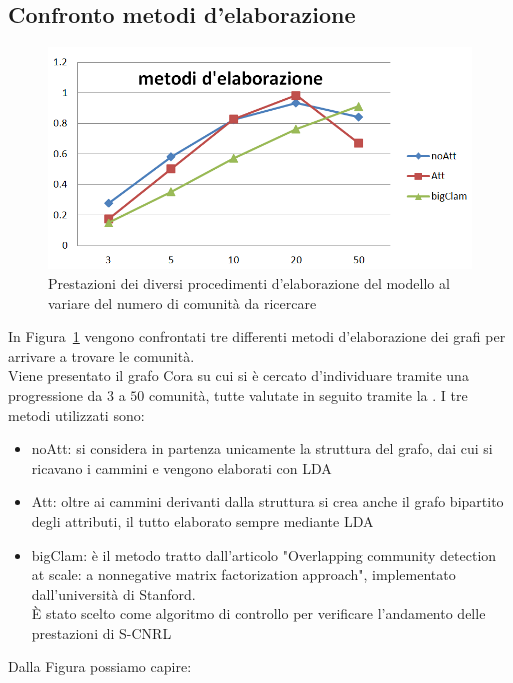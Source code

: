 \subsection{Confronto metodi d'elaborazione}%
%
\begin{figure}[htp]
	\centering
	\includegraphics[width=\linewidth]{immagini/MOD_3_elaborazione}
	\caption{Prestazioni dei diversi procedimenti d'elaborazione del modello al variare del numero di comunità da ricercare}
	\label{fig:MOD_3_elaborazione}
\end{figure}
%
In Figura~\ref{fig:MOD_3_elaborazione} vengono confrontati tre differenti metodi d'elaborazione dei grafi per arrivare a trovare le comunità.\\
Viene presentato il grafo Cora su cui si è cercato d'individuare tramite una progressione da $3$ a $50$ comunità, tutte valutate in seguito tramite la \mmod. I tre metodi utilizzati sono:
\begin{itemize}
	\item noAtt: si considera in partenza unicamente la struttura del grafo, dai cui si ricavano i cammini e vengono elaborati con LDA
	\item Att: oltre ai cammini derivanti dalla struttura si crea anche il grafo bipartito degli attributi, il tutto elaborato sempre mediante LDA
	\item bigClam: è il metodo tratto dall'articolo "Overlapping community detection at scale: a nonnegative matrix factorization approach"\cite{bigClam_paper}, implementato dall'università di Stanford\cite{bigClam_code}.\\
	È stato scelto come algoritmo di controllo per verificare l'andamento delle prestazioni di S-CNRL
\end{itemize}
Dalla Figura possiamo capire:
